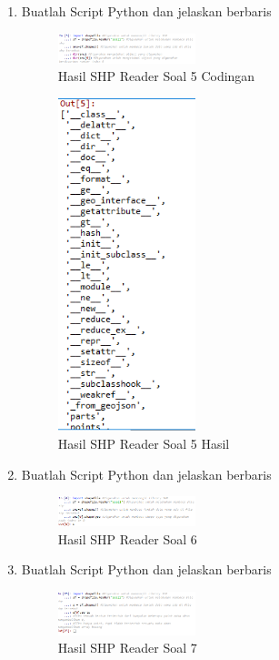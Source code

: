 \begin{enumerate}
    \item Buatlah Script Python dan jelaskan berbaris
    
    \hfill\break
    \begin{figure}[H]
		\includegraphics[width=4cm]{figures/1174002/3/soal5.png}
		\centering
		\caption{Hasil SHP Reader Soal 5 Codingan}
    \end{figure}

    \hfill\break
    \begin{figure}[H]
		\includegraphics[width=4cm]{figures/1174002/3/soal5_out.png}
		\centering
		\caption{Hasil SHP Reader Soal 5 Hasil}
    \end{figure}
    
    \item Buatlah Script Python dan jelaskan berbaris
    
    \hfill\break
    \begin{figure}[H]
		\includegraphics[width=4cm]{figures/1174002/3/soal6.png}
		\centering
		\caption{Hasil SHP Reader Soal 6}
    \end{figure}

    \item Buatlah Script Python dan jelaskan berbaris
    
    \hfill\break
    \begin{figure}[H]
		\includegraphics[width=4cm]{figures/1174002/3/soal7.png}
		\centering
		\caption{Hasil SHP Reader Soal 7}
    \end{figure}


\end{enumerate}
